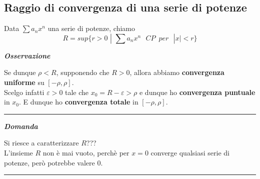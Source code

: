 \documentclass{article}
\theoremstyle{definition}
\newcommand{\linea}{\vspace{15pt}\hrule\vspace{15pt}}
\begin{document}
\subsection{Raggio di convergenza di una serie di potenze}
Data $\sum a_nx^n$ una serie di potenze, chiamo
\begin{equation}
    R=sup\{r > 0 \,\, | \,\, \sum a_nx^n \,\,\,\, CP \,\,\, per \,\,\,\, |x|<r\}
\end{equation}
\begin{center}
    \textbf{\textit{Osservazione}}
\end{center}
Se dunque $\rho < R$, supponendo che $R > 0$, allora abbiamo \textbf{convergenza uniforme} su $[-\rho, \rho]$.
\\
Scelgo infatti $\varepsilon > 0$ tale che $x_0 = R - \varepsilon > \rho$ e dunque ho \textbf{convergenza puntuale} in $x_0$. E dunque ho \textbf{convergenza totale} in $[-\rho, \rho]$.
\\
\linea
\begin{center}
    \textbf{\textit{Domanda}}
\end{center}
Si riesce a caratterizzare $R$???
\\
L'insieme $R$ non è mai vuoto, perchè per $x=0$ converge qualsiasi serie di potenze, però potrebbe valere 0.
\linea
\end{document}
